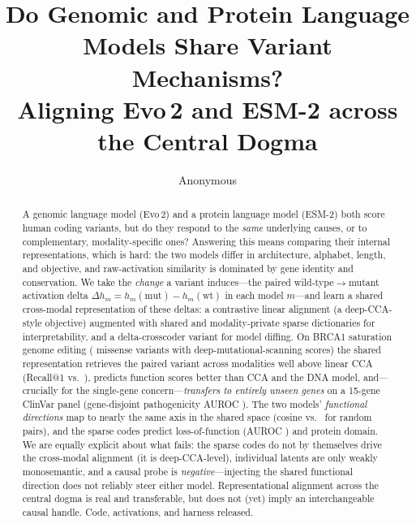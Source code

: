 \documentclass[10pt]{article}
\title{\textbf{Do Genomic and Protein Language Models Share Variant Mechanisms?\\
Aligning Evo\,2 and ESM-2 across the Central Dogma}}
\author{Anonymous}
\affil{}
\date{}
\begin{document}
\maketitle

\begin{abstract}
A genomic language model (Evo\,2) and a protein language model (ESM-2) both score human coding
variants, but do they respond to the \emph{same} underlying causes, or to complementary,
modality-specific ones? Answering this means comparing their internal representations, which is
hard: the two models differ in architecture, alphabet, length, and objective, and raw-activation
similarity is dominated by gene identity and conservation. We take the \emph{change} a variant
induces---the paired wild-type$\to$mutant activation delta
$\Delta h_m = h_m(\text{mut})-h_m(\text{wt})$ in each model $m$---and learn a shared cross-modal
representation of these deltas: a contrastive linear alignment (a deep-CCA-style objective)
augmented with shared and modality-private sparse dictionaries for interpretability, and a
delta-crosscoder variant for model diffing. On BRCA1 saturation genome editing (\brcaNmis{}
missense variants with deep-mutational-scanning scores) the shared representation retrieves the
paired variant across modalities well above linear CCA (Recall@1 \retRone{} vs.\ \retRoneCCA{}),
predicts function scores better than CCA and the DNA model, and---crucially for the single-gene
concern---\emph{transfers to entirely unseen genes} on a 15-gene ClinVar panel
(gene-disjoint pathogenicity AUROC \mgAuc{}). The two models' \emph{functional directions} map
to nearly the same axis in the shared space (cosine \cosDms{} vs.\ \cosRand{} for random pairs),
and the sparse codes predict loss-of-function (AUROC \lofShared{}) and protein domain. We are
equally explicit about what fails: the sparse codes do not by themselves drive the cross-modal
alignment (it is deep-CCA-level), individual latents are only weakly monosemantic, and a causal
probe is \emph{negative}---injecting the shared functional direction does not reliably steer
either model. Representational alignment across the central dogma is real and transferable, but
does not (yet) imply an interchangeable causal handle. Code, activations, and harness released.
\end{abstract}
\end{document}
